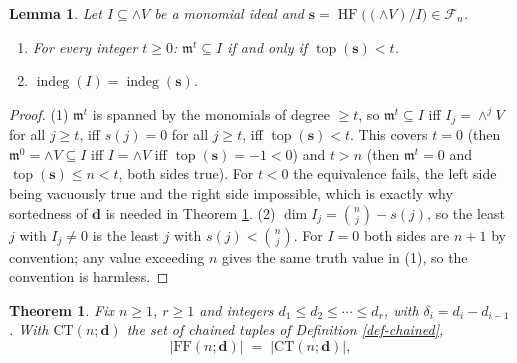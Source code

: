 \documentclass[11pt, a4paper, abstract=yes]{scrartcl}
\theoremstyle{definition}
\theoremstyle{remark}
\theoremstyle{plain}
\newtheorem{lemma}[definition]{Lemma}
\newtheorem{theorem}[definition]{Theorem}
\newcommand{\vek}[1]{\boldsymbol{#1}}
\newcommand{\indeg}{\operatorname{indeg}}
\newcommand{\tp}{\operatorname{top}}
\newcommand{\HF}{\operatorname{HF}}
\newcommand{\Ext}{\mathord{\wedge }V}
\begin{document}
\begin{lemma}
Let \(I\subseteq \Ext\) be a monomial ideal and \(\vek s=\HF\bigl((\Ext)/I\bigr)\in\mathcal F_n\).
\begin{enumerate}
\item For every integer \(t\ge0\): \(\mathfrak m^t\subseteq I\) if and only if \(\tp(\vek s)<t\).
\item \(\indeg(I)=\indeg(\vek s)\).
\end{enumerate}
\label{lem-dictionary}
\end{lemma}

\begin{proof}
(1) \(\mathfrak m^t\) is spanned by the monomials of degree \(\ge t\), so
\(\mathfrak m^t\subseteq I\) iff \(I_j=\wedge^jV\) for all \(j\ge t\), iff \(s(j)=0\) for all \(j\ge t\),
iff \(\tp(\vek s)<t\). This covers \(t=0\) (then \(\mathfrak m^0=\Ext\subseteq I\) iff \(I=\Ext\) iff
\(\tp(\vek s)=-1<0\)) and \(t>n\) (then \(\mathfrak m^t=0\) and \(\tp(\vek s)\le n<t\), both sides true). For
\(t<0\) the equivalence fails, the left side being vacuously true and the right side impossible,
which is exactly why sortedness of \(\vek d\) is needed in Theorem \ref{thm-chaining}.
(2) \(\dim I_j=\binom nj-s(j)\), so the least \(j\) with \(I_j\ne0\) is the least \(j\) with
\(s(j)<\binom nj\). For \(I=0\) both sides are \(n+1\) by convention; any value exceeding \(n\) gives
the same truth value in (1), so the convention is harmless.
\end{proof}

\begin{theorem}
Fix \(n\ge1\), \(r\ge1\) and integers \(d_1\le d_2\le\cdots\le d_r\), with
\(\delta_i=d_i-d_{i-1}\). With \(\mathrm{CT}(n;\vek d)\) the set of chained tuples of
Definition \ref{def-chained},
\begin{equation}\label{eq:auto-14}
  \lvert\mathrm{FF}(n;\vek d)\rvert\;=\;\lvert\mathrm{CT}(n;\vek d)\rvert ,
\end{equation}
\label{thm-chaining}
\end{theorem}
\end{document}

